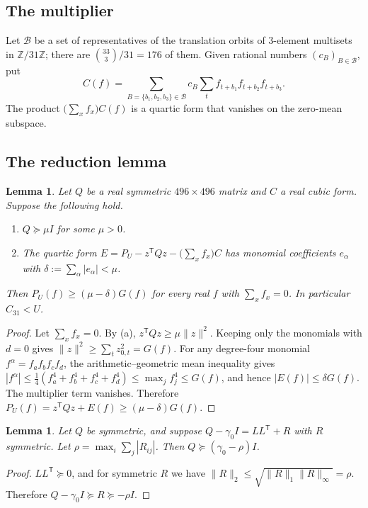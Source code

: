\documentclass[11pt]{amsart}
\newtheorem{lemma}[theorem]{Lemma}
\theoremstyle{definition}
\theoremstyle{remark}
\newcommand{\Z}{\mathbb{Z}}
\newcommand{\ZN}{\Z/31\Z}
\begin{document}
\subsection{The multiplier}
Let $\mathcal B$ be a set of representatives of the translation orbits of $3$-element multisets in $\ZN$; there are $\binom{33}{3}/31=176$ of them. Given rational numbers $(c_B)_{B\in\mathcal B}$, put
\[
  C(f)=\sum_{B=\{b_1,b_2,b_3\}\in\mathcal B} c_B\sum_{t}f_{t+b_1}f_{t+b_2}f_{t+b_3}.
\]
The product $\bigl(\sum_x f_x\bigr)C(f)$ is a quartic form that vanishes on the zero-mean subspace.

\subsection{The reduction lemma}

\begin{lemma}\label{lem:reduction}
Let $Q$ be a real symmetric $496\times496$ matrix and $C$ a real cubic form. Suppose the following hold.
\begin{enumerate}
  \item[(a)] $Q\succeq\mu I$ for some $\mu>0$.
  \item[(b)] The quartic form $E=P_U-z^{\mathsf T}Qz-\bigl(\sum_xf_x\bigr)C$ has monomial coefficients $e_\alpha$ with $\delta:=\sum_\alpha|e_\alpha|<\mu$.
\end{enumerate}
Then $P_U(f)\ge(\mu-\delta)G(f)$ for every real $f$ with $\sum_xf_x=0$. In particular $C_{31}<U$.
\end{lemma}

\begin{proof}
Let $\sum_x f_x=0$. By (a), $z^{\mathsf T}Qz\ge\mu\|z\|^2$. Keeping only the monomials with $d=0$ gives $\|z\|^2\ge\sum_tz_{0,t}^2=G(f)$. For any degree-four monomial $f^\alpha=f_af_bf_cf_d$, the arithmetic--geometric mean inequality gives $|f^\alpha|\le\frac14(f_a^4+f_b^4+f_c^4+f_d^4)\le\max_jf_j^4\le G(f)$, and hence $|E(f)|\le\delta G(f)$. The multiplier term vanishes. Therefore $P_U(f)=z^{\mathsf T}Qz+E(f)\ge(\mu-\delta)G(f)$.
\end{proof}

\begin{lemma}\label{lem:psd}
Let $Q$ be symmetric, and suppose $Q-\gamma_0I=LL^{\mathsf T}+R$ with $R$ symmetric. Let $\rho=\max_i\sum_j|R_{ij}|$. Then $Q\succeq(\gamma_0-\rho)I$.
\end{lemma}

\begin{proof}
$LL^{\mathsf T}\succeq0$, and for symmetric $R$ we have $\|R\|_2\le\sqrt{\|R\|_1\|R\|_\infty}=\rho$. Therefore $Q-\gamma_0 I\succeq R\succeq-\rho I$.
\end{proof}
\end{document}
